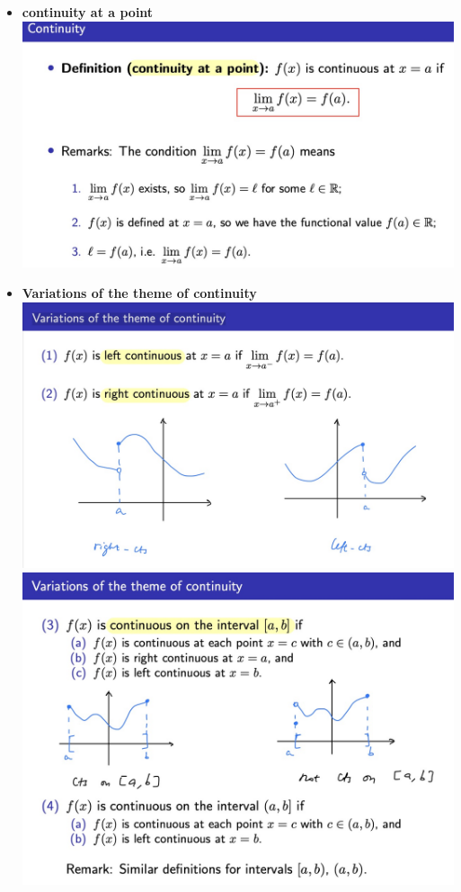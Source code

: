 \documentclass[10pt]{article}
\begin{document}
\begin{enumerate}
\begin{itemize}
\item \textbf{continuity at a point}\\
\includegraphics[width=1\textwidth]{images/W4-3.jpg}\\

\item \textbf{Variations of the theme of continuity}\\
\includegraphics[width=1\textwidth]{images/W4-4.jpg}\\
\includegraphics[width=1\textwidth]{images/W4-5.jpg}\\


\end{itemize}
\end{enumerate}
\end{document}
